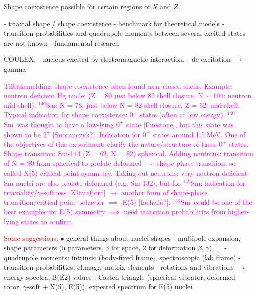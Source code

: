 \documentclass[twoside,english]{uiofysmaster/uiofysmaster}
\newcommand{\Sm}{$^{140}$Sm} %
\newcommand{\ga}{$\gamma$}
\begin{document}
Shape coexistence possible for certain regions of $N$ and $Z$.

\bigskip

- triaxial shape / shape coexistence \newline
- benchmark for theoretical models \newline
- transition probabilities and quadrupole moments between several excited states are not known \newline
- fundamental research

\bigskip

COULEX: \newline
- nucleus excited by electromagnetic interaction. \newline
- de-excitation $\rightarrow$ gamma

\bigskip

\textcolor{Magenta}{Tilbakemelding: \newline 
shape coexistence often found near closed shells. Example: neutron deficient Hg nuclei (Z = 80 just below 82 shell closure, N $\sim$ 104: neutron mid-shell). \newline
\Sm: N = 78, just below N = 82 shell closure, Z = 62: mid-shell. \newline
Typical indication for shape coexistence: $0^+$ states (often at low energy). \newline 
\Sm ~was thought to have a low-lying $0^+$ state [Firestone], but this state was shown to be $2^+$ [Suoranczyk?]. Indication for $0^+$ states around 1.5 MeV. \newline 
One of the objectives of this experiment: clarify the nature/structure of these $0^+$ states. \newline 
Shape transition: Sm-144 (Z = 62, N = 82) spherical. Adding neutrons: transition of N = 90 from spherical to prolate deformed $\rightarrow$ shape-phase transition, so called X(5) critical-point symmetry. \newline
Taking out neutrons: very neutron-deficient Sm nuclei are also prolate deformed (e.g. Sm-132), but for \Sm: indication for triaxiality/\ga-softness [Klintefjord] $\rightarrow$ another form of shape-phase transition/critical point behavior $\implies$ E(5) [Iachello?]. \Sm ~could be one of the best examples for E(5) symmetry $\implies$ need transition probabilities from higher-lying states to confirm.} \newline


\textcolor{red}{Some suggestions:} \newline
$\bullet$ general things about nuclei shapes \newline
- multipole expansion, shape parameters (5 parameters, 3 for space, 2 for deformation $\beta$, \ga), ... \newline
- quadrupole moments: intrinsic (body-fixed frame), spectroscopic (lab frame)  \newline
- transition probabilities, el.magn. matrix elements  \newline
- rotations and vibrations $\rightarrow$ energy spectra, B(E2) values  \newline
- Casten triangle (spherical vibrator, deformed rotor, \ga-soft + X(5), E(5)), expected spectrum for E(5) nuclei \newline
\end{document}
